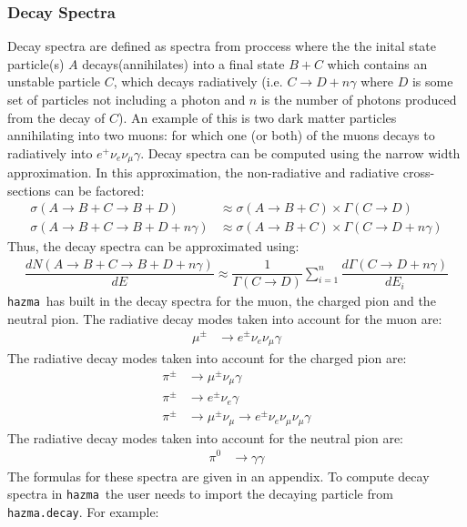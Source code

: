 \documentclass[review]{elsarticle}
\newcommand{\mil}[1]{\texttt{#1}}
\newcommand{\hazma}{\mil{hazma}}
\begin{document}
\subsubsection{Decay Spectra}

Decay spectra are defined as spectra from proccess where the the inital state particle(s) \(A\) decays(annihilates) into a final state \(B + C\) which contains an unstable particle \(C\), which decays radiatively (i.e. \(C \to D + n\gamma\) where \(D\) is some set of particles not including a photon and \(n\) is the number of photons produced from the decay of \(C\)). An example of this is two dark matter particles annihilating into two muons: for which one (or both) of the muons decays to radiatively into \(e^{+}\nu_{e}\nu_{\mu}\gamma\). Decay spectra can be computed using the narrow width approximation. In this approximation, the non-radiative and radiative cross-sections can be factored:
\begin{align}
	\sigma(A\to B + C \to B + D)           & \approx \sigma(A \to B + C)\times\Gamma(C\to D)           \\
	\sigma(A\to B + C \to B + D + n\gamma) & \approx \sigma(A \to B + C)\times\Gamma(C\to D + n\gamma)
\end{align}
Thus, the decay spectra can be approximated using:
\begin{align}
	\dfrac{dN(A\to B + C \to B + D + n\gamma)}{dE} \approx \dfrac{1}{\Gamma(C\to D)}\sum_{i=1}^{n}\dfrac{d\Gamma(C\to D + n\gamma)}{dE_{i}}
\end{align}
\hazma\ has built in the decay spectra for the muon, the charged pion and the neutral pion. The radiative decay modes taken into account for the muon are:
\begin{align}
	\mu^{\pm} & \to e^{\pm}\nu_{e}\nu_{\mu}\gamma
\end{align}
The radiative decay modes taken into account for the charged pion are:
\begin{align}
	\pi^{\pm} & \to \mu^{\pm}\nu_{\mu}\gamma                                     \\
	\pi^{\pm} & \to e^{\pm}\nu_{e}\gamma                                         \\
	\pi^{\pm} & \to \mu^{\pm}\nu_{\mu}\to e^{\pm}\nu_{e}\nu_{\mu}\nu_{\mu}\gamma
\end{align}
The radiative decay modes taken into account for the neutral pion are:
\begin{align}
	\pi^{0} & \to \gamma\gamma
\end{align}
The formulas for these spectra are given in an appendix. To compute decay spectra in \hazma\, the user needs to import the decaying particle from \mil{hazma.decay}. For example:
\end{document}
